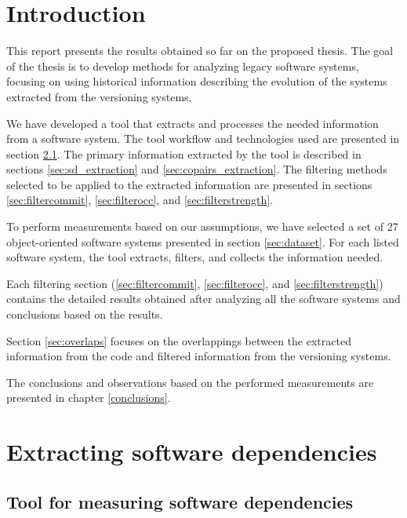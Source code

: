 \documentclass[12pt]{mitthesis}
\begin{document}


\tableofcontents

\pagestyle{plain}


\chapter{Introduction}


This report presents the results obtained so far on the proposed thesis. The goal of the thesis is to develop methods for analyzing legacy software systems, focusing on using historical information describing the evolution of the systems extracted from the versioning systems.

We have developed a tool that extracts and processes the needed information from a software system. The tool workflow and technologies used are presented in section \ref{sec:tool}. The primary information extracted by the tool is described in sections \ref{sec:sd_extraction} and \ref{sec:copairs_extraction}. The filtering methods selected to be applied to the extracted information are presented in sections \ref{sec:filtercommit}, \ref{sec:filterocc}, and \ref{sec:filterstrength}.

To perform measurements based on our assumptions, we have selected a set of 27 object-oriented software systems presented in section \ref{sec:dataset}. 
For each listed software system, the tool extracts, filters, and collects the information needed.

Each filtering section (\ref{sec:filtercommit}, \ref{sec:filterocc}, and \ref{sec:filterstrength}) contains the detailed results obtained after analyzing all the software systems and conclusions based on the results. 

Section \ref{sec:overlaps} focuses on the overlappings between the extracted information from the code and filtered information from the versioning systems. 

The conclusions and observations based on the performed measurements are presented in chapter \ref{conclusions}.




\chapter{Extracting software dependencies}
\label{extraction}

\section{Tool for measuring software dependencies}
\label{sec:tool}
\end{document}
